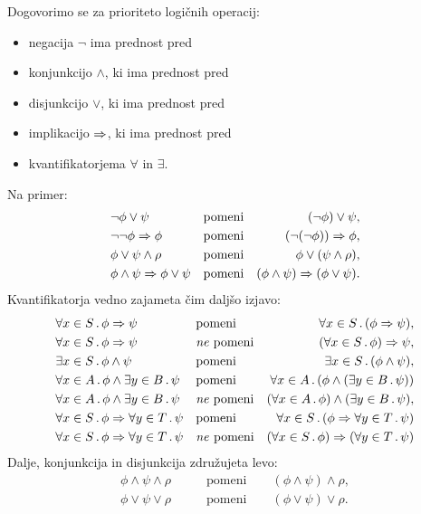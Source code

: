 Dogovorimo se za prioriteto logičnih operacij:
%
\begin{itemize}
\item negacija $\lnot$ ima prednost pred
\item konjunkcijo $\land$, ki ima prednost pred
\item disjunkcijo $\lor$, ki ima prednost pred
\item implikacijo $\Rightarrow$, ki ima prednost pred
\item kvantifikatorjema $\forall$ in $\exists$.
\end{itemize}
%
Na primer:
%
\begin{align*}
  &\lnot \phi \lor \psi
    &&\text{pomeni}
  &(\lnot \phi) \lor \psi, \\
  &\lnot \lnot \phi \Rightarrow \phi
    &&\text{pomeni}
  &(\lnot(\lnot\phi)) \Rightarrow \phi, \\
  &\phi \lor \psi \land \rho
    &&\text{pomeni}
  &\phi \lor (\psi \land \rho), \\
  &\phi \land \psi \Rightarrow \phi \lor \psi
    &&\text{pomeni}
  &(\phi \land \psi) \Rightarrow (\phi \lor \psi).
\end{align*}
%
Kvantifikatorja vedno zajameta čim daljšo izjavo:
%
\begin{align*}
  &\forall x \in S \,.\, \phi \Rightarrow \psi
    &&\text{pomeni}
  &\forall x \in S \,.\, (\phi \Rightarrow \psi), \\
  &\forall x \in S \,.\, \phi \Rightarrow \psi
    &&\text{\emph{ne} pomeni}
  &(\forall x \in S \,.\, \phi) \Rightarrow \psi,\\
  &\exists x \in S \,.\, \phi \land \psi
    &&\text{pomeni}
  &\exists x \in S \,.\, (\phi \land \psi), \\
  &\forall x \in A \,.\, \phi \land \exists y \in B \,.\, \psi
    &&\text{pomeni}
  &\forall x \in A \,.\, (\phi \land (\exists y \in B \,.\, \psi)) \\
  &\forall x \in A \,.\, \phi \land \exists y \in B \,.\, \psi
    &&\text{\emph{ne} pomeni}
  &(\forall x \in A \,.\, \phi) \land (\exists y \in B \,.\, \psi), \\
  &\forall x \in S \,.\, \phi \Rightarrow \forall y \in T \,.\, \psi
    &&\text{pomeni}
  &\forall x \in S \,.\, (\phi \Rightarrow \forall y \in T \,.\, \psi) \\
  &\forall x \in S \,.\, \phi \Rightarrow \forall y \in T \,.\, \psi
    &&\text{\emph{ne }pomeni}
  &(\forall x \in S \,.\, \phi) \Rightarrow (\forall y \in T \,.\, \psi)
\end{align*}
%
Dalje, konjunkcija in disjunkcija združujeta levo:
% 
\begin{align*}
  \phi \land \psi \land \rho
  &\qquad\text{pomeni}\qquad
  (\phi \land \psi) \land \rho,\\
  \phi \lor \psi \lor \rho
  &\qquad\text{pomeni}\qquad
  (\phi \lor \psi) \lor \rho.
\end{align*}
